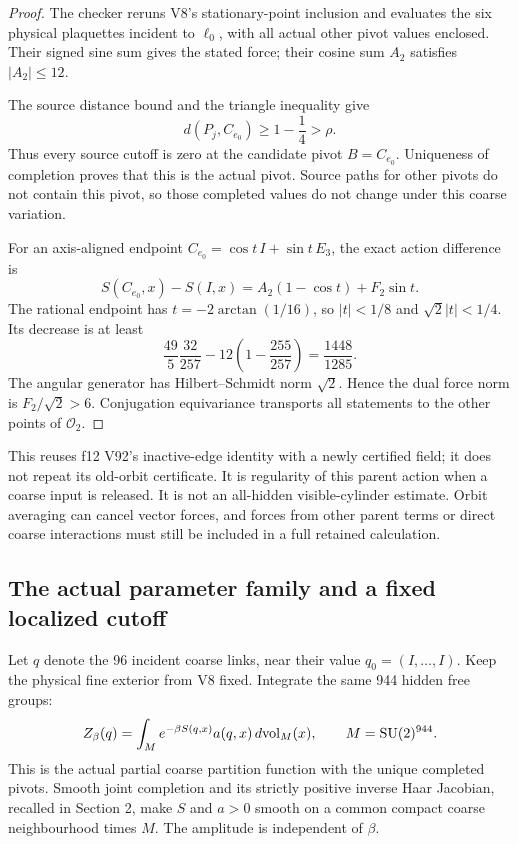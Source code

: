 \documentclass[11pt,oneside]{article}
\DeclareMathOperator{\SU}{SU}
\begin{document}
\begin{proof}
The checker
reruns V8's stationary-point inclusion and
evaluates the six physical plaquettes
incident to \(\ell_0\), with all actual
other pivot values enclosed. Their
signed sine sum gives the stated force;
their cosine sum \(A_2\) satisfies
\(|A_2|\le12\).

The source distance bound and the
triangle inequality give
\[
 d(P_j,C_{e_0})\ge1-\frac14>\rho .
\]
Thus every source cutoff is zero at
the candidate pivot \(B=C_{e_0}\).
Uniqueness of completion proves that
this is the actual pivot. Source paths
for other pivots do not contain this
pivot, so those completed values do
not change under this coarse variation.

For an axis-aligned endpoint
\(C_{e_0}=\cos t\,I+\sin t\,E_3\),
the exact action difference is
\[
 S(C_{e_0},x)-S(I,x)
       =A_2(1-\cos t)+F_2\sin t .
\]
The rational endpoint has
\(t=-2\arctan(1/16)\), so
\(|t|<1/8\) and
\(\sqrt2|t|<1/4\). Its decrease is at
least
\[
 \frac{49}{5}\frac{32}{257}
       -12\left(1-\frac{255}{257}\right)
       =\frac{1448}{1285}.
\]
The angular generator has
Hilbert--Schmidt norm \(\sqrt2\).
Hence the dual force norm is
\(F_2/\sqrt2>6\). Conjugation
equivariance transports all statements
to the other points of \(\mathcal O_2\).
\end{proof}

This reuses f12 V92's inactive-edge
identity with a newly certified field;
it does not repeat its old-orbit
certificate. It is regularity of
this parent action when a coarse
input is released. It is not an
all-hidden visible-cylinder estimate.
Orbit averaging can cancel vector
forces, and forces from other parent
terms or direct coarse interactions
must still be included in a full
retained calculation.

\subsection{The actual parameter family and a fixed localized cutoff}

Let \(q\) denote the 96 incident
coarse links, near their value
\(q_0=(I,\ldots,I)\). Keep the physical
fine exterior from V8 fixed. Integrate
the same 944 hidden free groups:
\[
 Z_\beta(q)=\int_M
       e^{-\beta S(q,x)}a(q,x)\,d{\rm vol}_M(x),
 \qquad M=\SU(2)^{944}.
\]
This is the actual partial coarse
partition function with the unique
completed pivots. Smooth joint
completion and its strictly positive
inverse Haar Jacobian, recalled in
Section 2, make \(S\) and \(a>0\)
smooth on a common compact coarse
neighbourhood times \(M\). The
amplitude is independent of \(\beta\).
\end{document}
